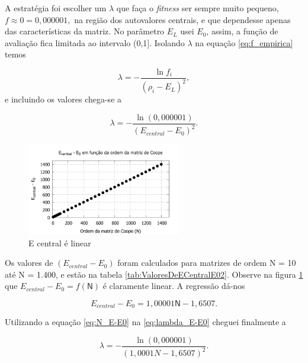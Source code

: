 	A estratégia foi escolher um $\lambda$ que faça o \emph{fitness} ser sempre muito pequeno, $f \approx 0 = 0,000001,$ na região dos autovalores centrais, e que dependesse apenas das características da matriz. No parâmetro $E_L$ usei $E_0$, assim, a função de avaliação fica limitada ao intervalo (0,1]. Isolando $\lambda$ na equação \ref{eq:f_empirica} temos
	
	\begin{equation}
				\lambda = - \frac{\ln f_i}{(\rho_i - E_L)^2},
	\end{equation}
	e incluindo os valores chega-se a
	
	\begin{equation}\label{eq:lambda_E-E0}
				\lambda = - \frac{\ln(0,000001)}{(E_{central} - E_0)^2}.
	\end{equation}
	
	\begin{figure}
		\centering
			\includegraphics[width=0.60\textwidth]{figs/resultados/precisaoFitness/E-central_eE0_funcao_N.pdf}
		\caption{E central é linear}
		\label{fig:E-central_eE0_funcao_N}
	\end{figure}
	
	Os valores de $(E_{central} - E_0)$ foram calculados para matrizes de ordem N = 10 até N = 1.400, e estão na tabela \ref{tab:ValoresDeECentralE02}. Observe na figura \ref{fig:E-central_eE0_funcao_N} que $E_{central} - E_0 = f(\mathsf{N})$ é claramente linear. A regressão dá-nos
	
	\begin{equation}\label{eq:N_E-E0}
			E_{central} - E_0 = 1,00001\mathsf{N} - 1,6507.
	\end{equation}
	
	Utilizando a equação \ref{eq:N_E-E0} na \ref{eq:lambda_E-E0} cheguei finalmente a
	
	\begin{equation}\label{eq:lambda_N}
		\lambda = - \frac{\ln(0,000001)}{(1,0001N - 1,6507)^2}.
	\end{equation}
		
